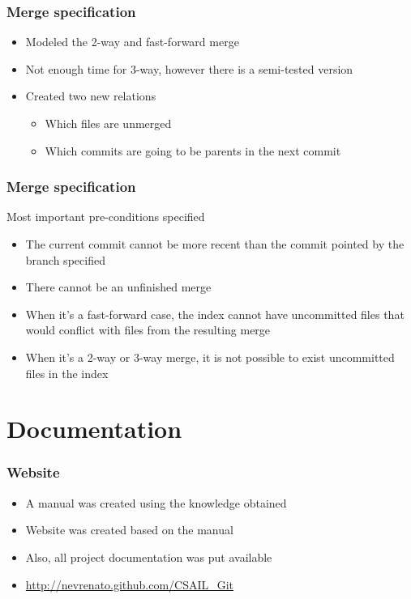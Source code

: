 \documentclass{beamer}
\begin{document}
\begin{frame}[fragile]
	\frametitle{Merge specification}
	\begin{itemize}
	\item Modeled the 2-way and fast-forward merge
	\item Not enough time for 3-way, however there is a semi-tested
	version
	\item Created two new relations
	\begin{itemize}
		\item Which files are unmerged
		\item Which commits are going to be parents in the next commit
	\end{itemize}
	\end{itemize}
\end{frame}

\begin{frame}[fragile]
	\frametitle{Merge specification}
	\begin{block}{Most important pre-conditions specified}
	\begin{itemize}
		\item The current commit cannot be more recent than the commit
		pointed by the branch specified
		\item There cannot be an unfinished merge
		\item When it's a fast-forward case, the index cannot have
		uncommitted files that would conflict with files from the 
		resulting merge
		\item When it's a 2-way or 3-way merge, it is not possible
		to exist uncommitted files in the index
	\end{itemize}
	\end{block}


\end{frame}

\section{Documentation}

\begin{frame}
	\frametitle{Website}
	\begin{itemize}
	\item A manual was created using the knowledge obtained
	\item Website was created based on the manual 
	\item Also, all project documentation was put available
	\item \url{http://nevrenato.github.com/CSAIL\_Git}
	\end{itemize}

\end{frame}
\end{document}
